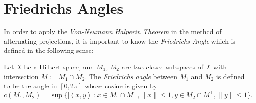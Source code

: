 \section{Friedrichs Angles}\label{sec:friedrichs}
In order to apply the \emph{Von-Neumann Halperin Theorem} in the method of alternating projections, it is important to know the \emph{Friedrichs Angle} which is defined in the following sense:
\begin{definition}
Let $X$ be a Hilbert space, and $M_1$, $M_2$ are two closed subspaces of $X$ with intersection $M:=M_1\cap M_2$. The \emph{Friedrichs angle} between $M_1$ and $M_2$ is defined to be the angle in $[0,2\pi]$ whose cosine is given by
$$ c(M_1,M_2)=\sup\{|\left\langle x,y\right\rangle|\colon x\in M_{1}\cap M^{\perp}, \|x\|\leq 1, y\in M_2\cap M^{\perp},\|y\|\leq 1\}.$$
\end{definition}

